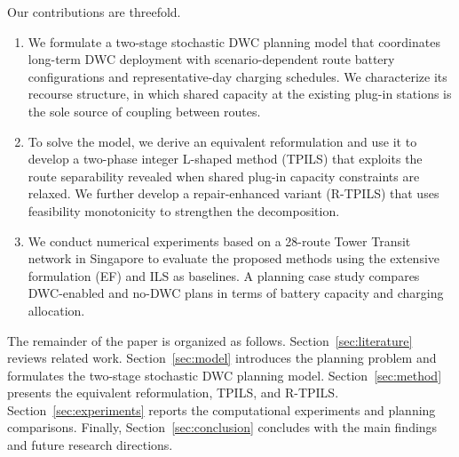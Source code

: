 Our contributions are threefold.
\begin{enumerate}
\renewcommand{\labelenumi}{\roman{enumi}.}
\item We formulate a two-stage stochastic DWC planning model that coordinates long-term DWC deployment with scenario-dependent route battery configurations and representative-day charging schedules.
We characterize its recourse structure, in which shared capacity at the existing plug-in stations is the sole source of coupling between routes.
\item To solve the model, we derive an equivalent reformulation and use it to develop a two-phase integer L-shaped method (TPILS) that exploits the route separability revealed when shared plug-in capacity constraints are relaxed.
We further develop a repair-enhanced variant (R-TPILS) that uses feasibility monotonicity to strengthen the decomposition.
\item We conduct numerical experiments based on a 28-route Tower Transit network in Singapore to evaluate the proposed methods using the extensive formulation (EF) and ILS as baselines.
A planning case study compares DWC-enabled and no-DWC plans in terms of battery capacity and charging allocation.
\end{enumerate}

The remainder of the paper is organized as follows.
Section~\ref{sec:literature} reviews related work.
Section~\ref{sec:model} introduces the planning problem and formulates the two-stage stochastic DWC planning model.
Section~\ref{sec:method} presents the equivalent reformulation, TPILS, and R-TPILS.
Section~\ref{sec:experiments} reports the computational experiments and planning comparisons.
Finally, Section~\ref{sec:conclusion} concludes with the main findings and future research directions.
